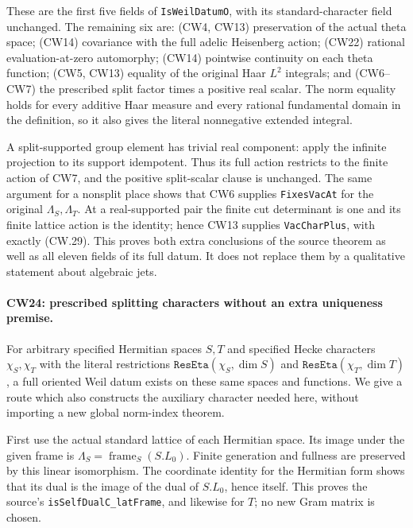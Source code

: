 These are the first five fields of \texttt{IsWeilDatumO}, with
its standard-character field unchanged.  The remaining six are:
(CW4, CW13) preservation of the actual theta space;
(CW14) covariance with the full adelic Heisenberg action;
(CW22) rational evaluation-at-zero automorphy;
(CW14) pointwise continuity on each theta function;
(CW5, CW13) equality of the original Haar $L^2$ integrals;
and (CW6--CW7) the prescribed split factor times a positive
real scalar.  The norm equality holds for every additive Haar
measure and every rational fundamental domain in the definition,
so it also gives the literal nonnegative extended integral.

A split-supported group element has trivial real component:
apply the infinite projection to its support idempotent.
Thus its full action restricts to the finite action of CW7,
and the positive split-scalar clause is unchanged.  The same
argument for a nonsplit place shows that CW6 supplies
\texttt{FixesVacAt} for the original $\Lambda_S,\Lambda_T$.
At a real-supported pair the finite cut determinant is one and
its finite lattice action is the identity; hence CW13 supplies
\texttt{VacCharPlus}, with exactly (CW.29).
This proves both extra conclusions of the source theorem as
well as all eleven fields of its full datum.  It does not
replace them by a qualitative statement about algebraic jets.

\paragraph{CW24: prescribed splitting characters without an extra uniqueness premise.}
For arbitrary specified Hermitian spaces $S,T$ and specified
Hecke characters $\chi_S,\chi_T$ with the literal restrictions
$\texttt{ResEta}(\chi_S,\dim S)$ and
$\texttt{ResEta}(\chi_T,\dim T)$, a full oriented Weil datum
exists on these same spaces and functions.  We give a route
which also constructs the auxiliary character needed here,
without importing a new global norm-index theorem.

First use the actual standard lattice of each Hermitian space.
Its image under the given frame is
$\Lambda_S=\operatorname{frame}_S(S.L_0)$.
Finite generation and fullness are preserved by this linear
isomorphism.  The coordinate identity for the Hermitian form
shows that its dual is the image of the dual of $S.L_0$, hence
itself.  This proves the source's
\texttt{isSelfDualC\_latFrame}, and likewise for $T$;
no new Gram matrix is chosen.

